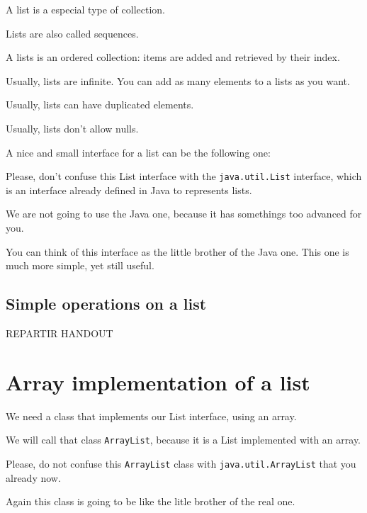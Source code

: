 \documentclass[a4paper, 9pt]{extarticle}
\begin{document}
A list is a especial type of collection.

Lists are also called sequences.

A lists is an ordered collection: items are added and retrieved by their index.

Usually, lists are infinite. You can add as many elements to a lists as you want.

Usually, lists can have duplicated elements.

Usually, lists don't allow nulls.

A nice and small interface for a list can be the following one:


Please, don't confuse this List interface with the \verb+java.util.List+
interface, which is an interface already defined in Java to represents lists.

We are not going to use the Java one, because it has somethings too advanced
for you.

You can think of this interface as the little brother of the Java one. This one
is much more simple, yet still useful.

\subsection{Simple operations on a list}



REPARTIR HANDOUT














\section{Array implementation of a list}

We need a class that implements our List interface, using an array.

We will call that class \verb+ArrayList+, because it is a List implemented with an array.

Please, do not confuse this \verb+ArrayList+ class with \verb+java.util.ArrayList+ that you already now.

Again this class is going to be like the litle brother of the real one.

\end{document}
